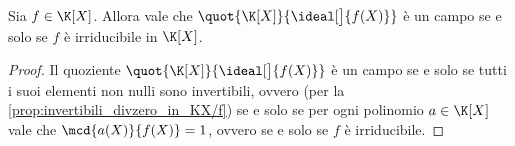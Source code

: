 \begin{corollary}
    Sia $f \in \K[X]$. Allora vale che $\quot{\K[X]}{\ideal[\big]{f(X)}}$ è un campo se e solo se $f$ è irriducibile in $\K[X]$.
\end{corollary}
\begin{proof}
    Il quoziente $\quot{\K[X]}{\ideal[\big]{f(X)}}$ è un campo se e solo se tutti i suoi elementi non nulli sono invertibili, ovvero (per la \autoref{prop:invertibili_divzero_in_KX/f}) se e solo se per ogni polinomio $a \in \K[X]$ vale che $\mcd{a(X)}{f(X)} = 1$, ovvero se e solo se $f$ è irriducibile.
\end{proof}